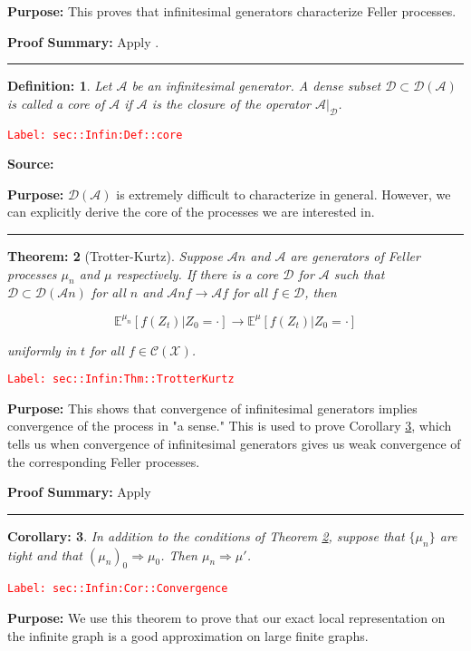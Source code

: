 \documentclass[12pt]{article}
\newcommand{\mb}{\mathbb}
\newcommand{\mc}{\mathcal}
\newcommand{\ra}{\rightarrow}
\newcommand{\tr}{\textcolor{red}}
\newcommand{\labe}[1]{\tr{\texttt{Label: #1}}}
\newcommand{\purpose}{\textbf{Purpose: }}
\newcommand{\pfsum}{\textbf{Proof Summary: }}
\newcommand{\lin}{\rule{\linewidth}{0.4 pt}}
\newcommand{\exmu}[2]{\mb{E}^{#1}\left[#2\right]}	%
\newcommand{\IG}{\mc{A}}						%
\newcommand{\core}{\mc{D}}							%
\newtheorem{thms}{Theorem: }[section]
\newtheorem{coro}[thms]{Corollary: }
\newtheorem{defn}[thms]{Definition: }
\begin{document}
\purpose This proves that infinitesimal generators characterize Feller processes.

\pfsum Apply \cite[Theorem 1.5,2.9]{Lig85}.

\lin

\begin{defn}
Let \(\IG{}\) be an infinitesimal generator. A dense subset \(\core\subset \core(\IG{})\) is called a core of \(\IG{}\) if \(\IG{}\) is the closure of the operator \(\IG{}|_\core\).
\label{sec::Infin:Def::core}
\end{defn}
\labe{sec::Infin:Def::core}

\textbf{Source: }\cite[Definition 2.11]{Lig85}

\purpose \(\core(\IG{})\) is extremely difficult to characterize in general. However, we can explicitly derive the core of the processes we are interested in.

\lin

\begin{thms}[Trotter-Kurtz]
Suppose \(\IG{n}\) and \(\IG{}\) are generators of Feller processes \(\mu_n\) and \(\mu\) respectively. If there is a core \(\core\) for \(\IG{}\) such that \(\core \subset \mc{D}(\IG{n})\) for all \(n\) and \(\IG{n} f \ra \IG{} f\) for all \(f \in \core\), then 

\[\exmu{\mu_n}{f(Z_t)|Z_0=\cdot} \ra \exmu{\mu}{f(Z_t)|Z_0=\cdot}\]

uniformly in \(t\) for all \(f \in \mc{C}(\mc{X})\).
\label{sec::Infin:Thm::TrotterKurtz}
\end{thms}
\labe{sec::Infin:Thm::TrotterKurtz}

\purpose This shows that convergence of infinitesimal generators implies convergence of the process in "a sense." This is used to prove Corollary \ref{sec::Infin:Cor::Convergence}, which tells us when convergence of infinitesimal generators gives us weak convergence of the corresponding Feller processes.

\pfsum Apply \cite[Theorem 2.12]{Lig85}

\lin

\begin{coro}
In addition to the conditions of Theorem \ref{sec::Infin:Thm::TrotterKurtz}, suppose that \(\{\mu_n\}\) are tight and that \((\mu_n)_0 \Rightarrow \mu_0\). Then \(\mu_n \Rightarrow \mu'\).
\label{sec::Infin:Cor::Convergence}
\end{coro}
\labe{sec::Infin:Cor::Convergence}

\purpose We use this theorem to prove that our exact local representation on the infinite graph is a good approximation on large finite graphs.
\end{document}
